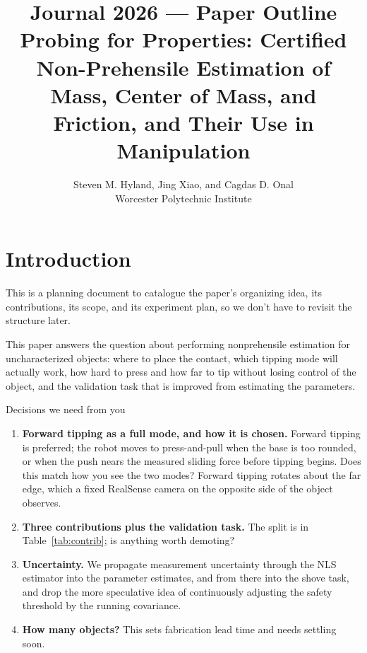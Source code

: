 \documentclass[10pt, conference]{IEEEtran}
\title{\LARGE \bf Journal 2026 --- Paper Outline\\[2pt]
\large Probing for Properties: Certified Non-Prehensile Estimation of\\
Mass, Center of Mass, and Friction, and Their Use in Manipulation}
\begin{document}
\author{Steven M. Hyland, Jing Xiao, and Cagdas D. Onal\\
\normalsize Worcester Polytechnic Institute}

\maketitle

\section{Introduction}

This is a planning document to catalogue the paper's organizing idea, its contributions, its scope, and its experiment plan, so we don't have to revisit the structure later.

This paper answers the question about performing nonprehensile estimation for uncharacterized objects: where to place the contact, which tipping mode will actually work, how hard to press and how far to tip without losing control of the object, and the validation task that is improved from estimating the parameters.

\begin{decbox}{Decisions we need from you}
\begin{enumerate}[leftmargin=*, itemsep=2pt, label=\arabic*.]
  \item \textbf{Forward tipping as a full mode, and how it is chosen.}
        Forward tipping is preferred; the robot moves to press-and-pull
        when the base is too rounded, or when the push nears the measured
        sliding force before tipping begins. Does this match how you see
        the two modes? Forward tipping rotates about the far edge, which a
        fixed RealSense camera on the opposite side of the object observes.
  \item \textbf{Three contributions plus the validation task.} The split
        is in Table~\ref{tab:contrib}; is anything worth demoting?
  \item \textbf{Uncertainty.} We propagate measurement uncertainty
        through the NLS estimator into the parameter estimates, and from
        there into the shove task, and drop the more speculative idea of
        continuously adjusting the safety threshold by the running
        covariance.
  \item \textbf{How many objects?} This sets fabrication lead time and
        needs settling soon.
\end{enumerate}
\end{decbox}
\end{document}
